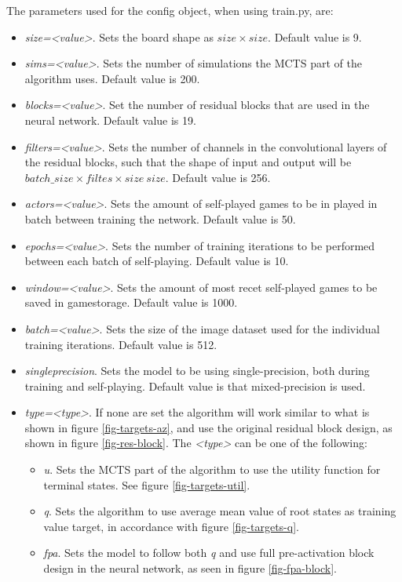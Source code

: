 The parameters used for the config object, when using train.py, are:
\begin{itemize}
	\itemsep-0.3em 
	\item \textit{size=<value>}. Sets the board shape as $size\times size$. Default value is 9.
	\item \textit{sims=<value>}. Sets the number of simulations the MCTS part of the algorithm uses. Default value is 200.
	\item \textit{blocks=<value>}. Set the number of residual blocks that are used in the neural network. Default value is 19.
	\item \textit{filters=<value>}. Sets the number of channels in the convolutional layers  of the residual blocks, such that the shape of input and output will be $batch\_size \times filtes \times size \ size$. Default value is 256.
	\item \textit{actors=<value>}. Sets the amount of self-played games to be in played in batch between training the network. Default value is 50.
	\item \textit{epochs=<value>}. Sets the number of training iterations to be performed between each batch of self-playing. Default value is 10.
	\item \textit{window=<value>}. Sets the amount of most recet self-played games to be saved in gamestorage. Default value is 1000.
	\item \textit{batch=<value>}. Sets the size of the image dataset used for the individual training iterations. Default value is 512.
	\item \textit{singleprecision}. Sets the model to be using single-precision, both during training and self-playing. Default value is that mixed-precision is used. 
	\item \textit{type=<type>}. If none are set the algorithm will work similar to what is shown in figure \ref{fig-targets-az}, and use the original residual block design, as shown in figure \ref{fig-res-block}. The \textit{<type>} can be one of the following:
	\begin{itemize}
		\itemsep-0.3em
		\item \textit{u}. Sets the MCTS part of the algorithm to use the utility function for terminal states. See figure \ref{fig-targets-util}.
		\item \textit{q}. Sets the algorithm to use average mean value of root states as training value target, in accordance with figure \ref{fig-targets-q}.
		\item \textit{fpa}. Sets the model to follow both \textit{q} and use full pre-activation block design in the neural network, as seen in figure \ref{fig-fpa-block}.
	\end{itemize}
\end{itemize}


